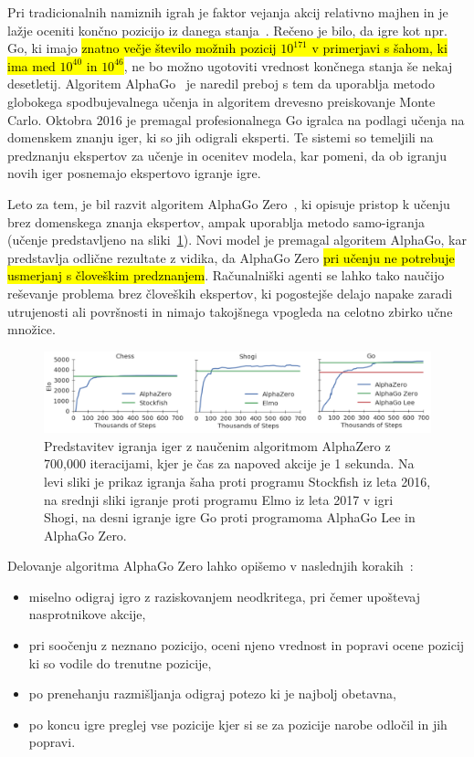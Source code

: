 \documentclass[a4paper, 12pt]{book}
\begin{document}
Pri tradicionalnih namiznih igrah je faktor vejanja akcij relativno majhen in je lažje oceniti končno pozicijo iz danega stanja~\cite{wiki:AlphaGo}.
Rečeno je bilo, da igre kot npr. Go, ki imajo \hl{znatno večje število možnih pozicij $10^{171}$ v primerjavi s šahom, ki ima med $10^{40}$ in $10^{46}$}, ne bo možno ugotoviti vrednost končnega stanja še nekaj desetletij.
Algoritem AlphaGo~\cite{silver2016mastering} je naredil preboj s tem da uporablja metodo globokega spodbujevalnega učenja in algoritem drevesno preiskovanje Monte Carlo. 
Oktobra 2016 je premagal profesionalnega Go igralca na podlagi učenja na domenskem znanju iger, ki so jih odigrali eksperti.
Te sistemi so temeljili na predznanju ekspertov za učenje in ocenitev modela, kar pomeni, da ob igranju novih iger posnemajo ekspertovo igranje igre.

Leto za tem, je bil razvit algoritem AlphaGo Zero~\cite{silver2017mastering}, ki opisuje pristop k učenju brez domenskega znanja ekspertov, ampak uporablja metodo samo-igranja (učenje predstavljeno na sliki~\ref{picCompareGo}). 
Novi model je premagal algoritem AlphaGo, kar predstavlja odlične rezultate z vidika, da AlphaGo Zero \hl{pri učenju ne potrebuje usmerjanj s človeškim predznanjem}.
Računalniški agenti se lahko tako naučijo reševanje problema brez človeških ekspertov, ki pogostejše delajo napake zaradi utrujenosti ali površnosti in nimajo takojšnega vpogleda na celotno zbirko učne množice.

\begin{figure}[h!]
	\begin{center}
		\includegraphics[width=1\textwidth]{photos/go.pdf}
	\end{center}
	\caption{Predstavitev igranja iger z naučenim algoritmom AlphaZero z 700,000 iteracijami, kjer je čas za napoved akcije je 1 sekunda. Na levi sliki je prikaz igranja šaha proti programu Stockfish iz leta 2016, na srednji sliki igranje proti programu Elmo iz leta 2017 v igri Shogi, na desni igranje igre Go proti programoma AlphaGo Lee in AlphaGo Zero. }
	\label{picCompareGo}
\end{figure}

Delovanje algoritma AlphaGo Zero lahko opišemo v naslednjih korakih~\cite{guid}:
\begin{itemize}
	\item miselno odigraj igro z raziskovanjem neodkritega, pri čemer upoštevaj nasprotnikove akcije,
	\item pri soočenju z neznano pozicijo, oceni njeno vrednost in popravi ocene pozicij ki so vodile do trenutne pozicije,
	\item po prenehanju razmišljanja odigraj potezo ki je najbolj obetavna,
	\item po koncu igre preglej vse pozicije kjer si se za pozicije narobe odločil in jih popravi.
\end{itemize}
\end{document}
